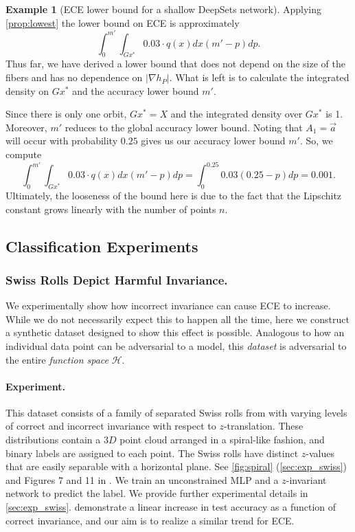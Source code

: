 \documentclass[10pt]{article} %
\theoremstyle{definition}
\newtheorem{example}{Example}
\begin{document}
\begin{example}[ECE lower bound for a shallow DeepSets network]
Applying \cref{prop:lowest} the lower bound on ECE is approximately
\begin{equation*}
    \int_0^{m'} \int_{Gx^*}0.03 \cdot q(x)dx (m' - p )dp.
\end{equation*}
Thus far, we have derived a lower bound that does not depend on the size of the fibers and has no dependence on $| \nabla h_P |$. What is left is to calculate the integrated density on $Gx^*$ and the accuracy lower bound $m'$. 

Since there is only one orbit, $Gx^* = X$ and the integrated density over $Gx^*$ is 1. Moreover, $m'$ reduces to the global accuracy lower bound. Noting that $A_1 = \vec{a}$ will occur with probability $0.25$ gives us our accuracy lower bound $m'$. So, we compute
\begin{equation*}
    \int_0^{m'} \int_{Gx^*}0.03 \cdot q(x)dx (m' - p )dp = \int_0^{0.25} 0.03 (0.25 - p )dp = 0.001.
\end{equation*}
Ultimately, the looseness of the bound here is due to the fact that the Lipschitz constant grows linearly with the number of points $n$.
\end{example}

\subsection{Classification Experiments} \label{sec:swiss}

\subsubsection{Swiss Rolls Depict Harmful Invariance.}  We experimentally show how incorrect invariance can cause ECE to increase. While we do not necessarily expect this to happen all the time, here we construct a synthetic dataset designed to show this effect is possible. Analogous to how an individual data point can be adversarial to a model, this \textit{dataset} is adversarial to the entire \textit{function space} $\mathscr{H}$.

\paragraph{Experiment.}  This dataset consists of a family of separated Swiss rolls from \cite{wang2024general} with varying levels of correct and incorrect invariance with respect to $z$-translation.  These distributions contain a $3D$ point cloud arranged in a spiral-like fashion, and binary labels are assigned to each point. The Swiss rolls have distinct $z$-values that are easily separable with a horizontal plane. See \cref{fig:spiral} (\cref{sec:exp_swiss}) and Figures 7 and 11 in \cite{wang2024general}.  We train an unconstrained MLP and a $z$-invariant network to predict the label.  We provide further experimental details in \cref{sec:exp_swiss}. \cite{wang2024general} demonstrate a linear increase in test accuracy as a function of correct invariance, and our aim is to realize a similar trend for ECE. 
\end{document}
